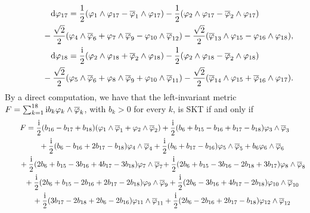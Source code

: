 \documentclass[pdftex]{sigma}
\numberwithin{equation}{section}
\begin{document}
\begin{Example}
\begin{gather*}
{\rm d} \varphi_{17} = \frac{1}{2} (\varphi_1 \wedge \varphi_{17} - \overline \varphi_1 \wedge \varphi_{17}) - \frac{1}{2} (\varphi_2 \wedge \varphi_{17} - \overline \varphi_2 \wedge \varphi_{17}) \\
\hphantom{{\rm d} \varphi_{18} =}{}- \frac{\sqrt{2}}{2} (\varphi_4 \wedge \overline \varphi_6 + \varphi_7 \wedge \overline \varphi_{9} - \varphi_{10} \wedge \overline \varphi_{12} ) - \frac{\sqrt{2}}{2} ( \overline \varphi_{13} \wedge \varphi_{15} - \varphi_{16} \wedge \varphi_{18}),\\
{\rm d} \varphi_{18} = \frac{{\rm i}}{2} (\varphi_2 \wedge \varphi_{18} + \overline \varphi_2 \wedge \varphi_{18}) - \frac{1}{2} (\varphi_2 \wedge \varphi_{18} - \overline \varphi_2 \wedge \varphi_{18}) \\
\hphantom{{\rm d} \varphi_{18} =}{}
- \frac{\sqrt{2}}{2} (\varphi_5 \wedge \overline \varphi_6 + \varphi_8 \wedge \overline \varphi_{9} +\varphi_{10} \wedge \overline \varphi_{11} )
 - \frac{\sqrt{2}}{2} ( \overline \varphi_{14} \wedge \varphi_{15} + \overline \varphi_{16} \wedge \varphi_{17}).
\end{gather*}
By a direct computation, we have that the left-invariant metric $F = \sum_{k =1}^{18} {\rm i}b_k \varphi_k \wedge \overline \varphi_k$, with $b_k > 0$ for every $k$, is SKT if and only if
\begin{gather*}
F = \frac{{\rm i}}{2} (b_{16} - b_{17} + b_{18}) (\varphi_1 \wedge \overline \varphi_1 + \varphi_2 \wedge \overline \varphi_2) + \frac{{\rm i}}{2} (b_6 +b_{15} - b_{16} + b_{17} - b_{18}) \varphi_3 \wedge \overline \varphi_3\\
\hphantom{F = }{} + \frac{{\rm i}}{2} (b_6 - b_{16} + 2 b_{17} - b_{18}) \varphi_4 \wedge \overline \varphi_4 + \frac{{\rm i}}{2} (b_6 + b_{17} - b_{16}) \varphi_5 \wedge \overline \varphi_5 + b_6 \varphi_6 \wedge \overline \varphi_6\\
\hphantom{F = }{} + \frac{{\rm i}}{2} (2 b_6 + b_{15} - 3 b_{16} + 4 b_{17} - 3 b_{18}) \varphi_7 \wedge \overline \varphi_7\!+ \frac{{\rm i}}{2} (2 b_6 + b_{15} -3 b_{16} - 2 b_{18} + 3 b_{17}) \varphi_8 \wedge \overline \varphi_8\!\\
\hphantom{F = }{} + \frac{{\rm i}}{2} ( 2 b_6 + b_{15} - 2 b_{16} + 2 b_{17} - 2 b_{18}) \varphi_9 \wedge \overline \varphi_9 + \frac{{\rm i}}{2} (2 b_6 - 3 b_{16} + 4 b_{17} - 2 b_{18}) \varphi_{10} \wedge \overline \varphi_{10}\\
\hphantom{F = }{} + \frac{{\rm i}}{2} (3 b_{17} - 2 b_{18} + 2 b_6 - 2 b_{16}) \varphi_{11} \wedge \overline \varphi_{11} + \frac{{\rm i}}{2} (2 b_6 - 2 b_{16} + 2 b_{17} - b_{18}) \varphi_{12} \wedge \overline \varphi_{12}\\

\end{gather*}
\end{Example}
\end{document}
